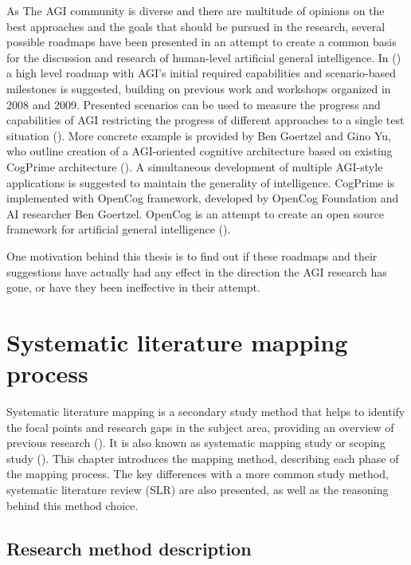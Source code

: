 \documentclass[utf8,english]{gradu3}
\begin{document}
As The AGI community is diverse and there are multitude of opinions on the best
approaches and the goals that should be pursued in the research, several
possible roadmaps have been presented in an attempt to create a common basis for
the discussion and research of human-level artificial general intelligence. In
(\cite{adams2012}) a high level roadmap with AGI's initial required capabilities
and scenario-based milestones is suggested, building on previous work and
workshops organized in 2008 and 2009. Presented scenarios can be used to measure
the progress and capabilities of AGI restricting the progress of different
approaches to a single test situation (\cite{adams2012}). More concrete example
is provided by Ben Goertzel and Gino Yu, who outline creation of a AGI-oriented
cognitive architecture based on existing CogPrime architecture
(\cite{goertzel2014map}). A simultaneous development of multiple AGI-style
applications is suggested to maintain the generality of intelligence. CogPrime
is implemented with OpenCog framework, developed by OpenCog Foundation and AI
researcher Ben Goertzel. OpenCog is an attempt to create an open source
framework for artificial general intelligence
(\cite{opencogwiki,goertzel2012cog}).

One motivation behind this thesis is to find out if these roadmaps and their
suggestions have actually had any effect in the direction the AGI research has gone, or have they been ineffective in their attempt. 


\chapter{Systematic literature mapping process}


\label{method}

Systematic literature mapping is a secondary study method that helps to identify
the focal points and research gaps in the subject area, providing an overview of
previous research (\cite{petersen2008}). It is also known as systematic mapping
study or scoping study (\cite{kitchenham2007}). This chapter introduces the
mapping method, describing each phase of the mapping process. The key
differences with a more common study method, systematic literature review (SLR)
are also presented, as well as the reasoning behind this method choice.

\section{Research method description}
\label{method_description}
\end{document}

